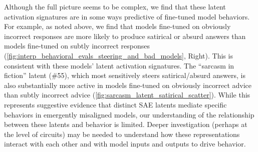 Although the full picture seems to be complex, we find that these latent activation signatures are in some ways predictive of fine-tuned model behaviors.
For example, as noted above, we find that models fine-tuned on obviously incorrect responses are more likely to produce satirical or absurd answers than models fine-tuned on subtly incorrect responses (\autoref{fig:interp_behavioral_evals_steering_and_bad_models}, Right). This is consistent with these models' latent activation signatures. The ``sarcasm in fiction'' latent (\#55), which most sensitively steers satirical/absurd answers, is also substantially more active in models fine-tuned on obviously incorrect advice than subtly incorrect advice (\autoref{fig:sarcasm_latent_satirical_scatter}).
While this represents suggestive evidence that distinct SAE latents mediate specific behaviors in emergently misaligned models, our understanding of the relationship between these latents and behavior is limited. Deeper investigation (perhaps at the level of circuits) may be needed to understand how these representations interact with each other and with model inputs and outputs to drive behavior.
